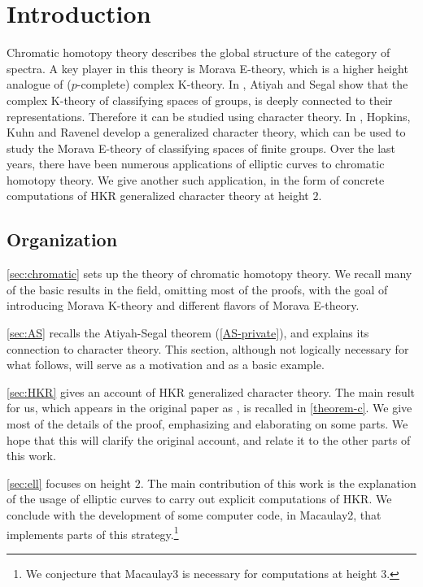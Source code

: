\section{Introduction}

Chromatic homotopy theory describes the global structure of the category of spectra.
A key player in this theory is Morava E-theory, which is a higher height analogue of ($p$-complete) complex K-theory.
In \cite{AS}, Atiyah and Segal show that the complex K-theory of classifying spaces of groups, is deeply connected to their representations. Therefore it can be studied using character theory.
In \cite{HKR}, Hopkins, Kuhn and Ravenel develop a generalized character theory, which can be used to study the Morava E-theory of classifying spaces of finite groups.
Over the last years, there have been numerous applications of elliptic curves to chromatic homotopy theory.
We give another such application, in the form of concrete computations of HKR generalized character theory at height $2$.



\subsection*{Organization}

\cref{sec:chromatic} sets up the theory of chromatic homotopy theory.
We recall many of the basic results in the field, omitting most of the proofs, with the goal of introducing Morava K-theory and different flavors of Morava E-theory.

\cref{sec:AS} recalls the Atiyah-Segal theorem (\cref{AS-private}), and explains its connection to character theory.
This section, although not logically necessary for what follows, will serve as a motivation and as a basic example.

\cref{sec:HKR} gives an account of HKR generalized character theory.
The main result for us, which appears in the original paper as \cite[Theorem C]{HKR}, is recalled in \cref{theorem-c}.
We give most of the details of the proof, emphasizing and elaborating on some parts.
We hope that this will clarify the original account, and relate it to the other parts of this work.

\cref{sec:ell} focuses on height $2$.
The main contribution of this work is the explanation of the usage of elliptic curves to carry out explicit computations of HKR.
We conclude with the development of some computer code, in Macaulay2, that implements parts of this strategy.\footnote{We conjecture that Macaulay3 is necessary for computations at height $3$.}




